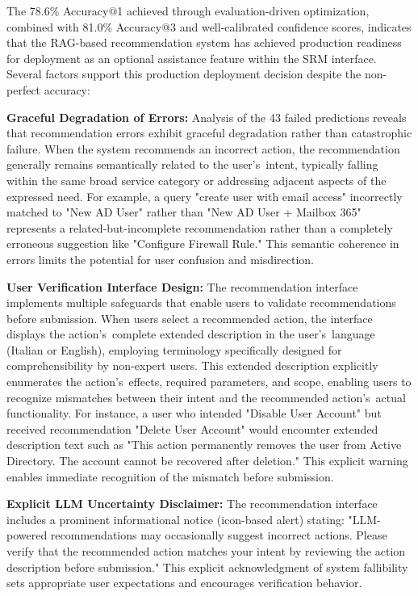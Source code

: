 The 78.6\% Accuracy@1 achieved through evaluation-driven optimization, combined with 81.0\% Accuracy@3 and well-calibrated confidence scores, indicates that the RAG-based recommendation system has achieved production readiness for deployment as an optional assistance feature within the SRM interface. Several factors support this production deployment decision despite the non-perfect accuracy:

\textbf{Graceful Degradation of Errors:} Analysis of the 43 failed predictions reveals that recommendation errors exhibit graceful degradation rather than catastrophic failure. When the system recommends an incorrect action, the recommendation generally remains semantically related to the user's~intent, typically falling within the same broad service category or addressing adjacent aspects of the expressed need. For example, a query "create user with email access" incorrectly matched to "New AD User" rather than "New AD User + Mailbox 365" represents a related-but-incomplete recommendation rather than a completely erroneous suggestion like "Configure Firewall Rule." This semantic coherence in errors limits the potential for user confusion and misdirection.

\textbf{User Verification Interface Design:} The recommendation interface implements multiple safeguards that enable users to validate recommendations before submission. When users select a recommended action, the interface displays the action's~complete extended description in the user's~language (Italian or English), employing terminology specifically designed for comprehensibility by non-expert users. This extended description explicitly enumerates the action's~effects, required parameters, and scope, enabling users to recognize mismatches between their intent and the recommended action's~actual functionality. For instance, a user who intended "Disable User Account" but received recommendation "Delete User Account" would encounter extended description text such as "This action permanently removes the user from Active Directory. The account cannot be recovered after deletion." This explicit warning enables immediate recognition of the mismatch before submission.

\textbf{Explicit LLM Uncertainty Disclaimer:} The recommendation interface includes a prominent informational notice (icon-based alert) stating: "LLM-powered recommendations may occasionally suggest incorrect actions. Please verify that the recommended action matches your intent by reviewing the action description before submission." This explicit acknowledgment of system fallibility sets appropriate user expectations and encourages verification behavior.


